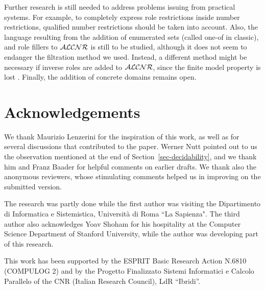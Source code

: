 Further research is still needed to address problems issuing from practical
systems. For example, to completely express role restrictions inside number
restrictions, qualified number restrictions \cite{HoBa91} should be taken into
account. Also,  the language resulting from the addition of enumerated sets
(called {\sc one-of} in {\sc classic}), and role fillers to ${\cal ALCNR}$ is still to
be studied, although it does not seem to endanger the filtration method we used.
Instead, a different method might be necessary if inverse roles are added
to ${\cal ALCNR}$, since  the finite model property is lost 
\cite<as shown in>{Schi91}. 
Finally, the addition of concrete domains \cite{BaHa91} remains open.



\section*{Acknowledgements}
We thank Maurizio Lenzerini for the inspiration of this work, as well as for 
several discussions that contributed to the paper. Werner Nutt
pointed out to us the observation mentioned at the end of
Section~\ref{sec-decidability}, and we thank
him and Franz Baader for helpful comments on earlier drafts. 
We thank also the anonymous reviewers, whose stimulating comments helped us
in improving on the submitted version. 

The research was partly done while the first author was visiting the
Dipartimento di Informatica e Sistemistica, Universit\`a di  Roma ``La
Sapienza".
The third author also acknowledges Yoav Shoham for his
hospitality at the Computer Science Department of  Stanford University, while
the author was developing part of this research. 

This work has been supported
by the ESPRIT Basic Research Action N.6810 (COMPULOG 2) and by the
Progetto Finalizzato Sistemi Informatici e Calcolo Parallelo of the
CNR (Italian Research Council), LdR ``Ibridi''.

\vskip 0.2in


%
%

